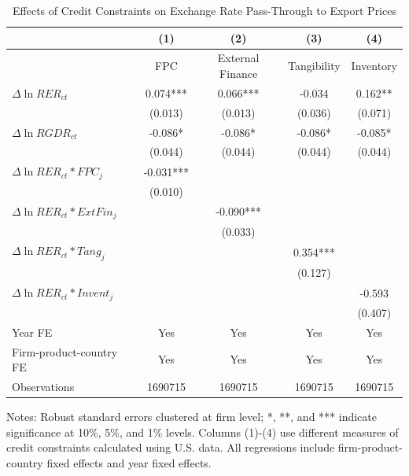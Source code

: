 \begin{table}[H]
	\centering
	\caption{Effects of Credit Constraints on Exchange Rate Pass-Through to Export Prices}
	\begin{threeparttable}	
		\begin{tabular}{lcccc}
			\toprule
			& (1)   & (2)   & (3)   & (4) \\
			\midrule
			& FPC   & External Finance & Tangibility & Inventory \\
			\midrule
			$\Delta \ln RER_{ct}$ & 0.074*** & 0.066*** & -0.034 & 0.162** \\
			& (0.013) & (0.013) & (0.036) & (0.071) \\
			$\Delta \ln RGDR_{ct}$ & -0.086* & -0.086* & -0.086* & -0.085* \\
			& (0.044) & (0.044) & (0.044) & (0.044) \\
			$\Delta \ln RER_{ct}*FPC_{j}$ & -0.031*** &       &       &  \\
			& (0.010) &       &       &  \\
			$\Delta \ln RER_{ct}*ExtFin_{j}$ &  & -0.090*** &       &  \\
			&  & (0.033) &       &  \\
			$\Delta \ln RER_{ct}*Tang_{j}$ &     &       & 0.354*** &  \\
			&     &       & (0.127) &  \\
			$\Delta \ln RER_{ct}*Invent_{j}$ &     &       &       & -0.593 \\
			&    &       &       & (0.407) \\
			Year FE  & Yes   & Yes   & Yes   & Yes \\
			Firm-product-country FE & Yes   & Yes   & Yes   & Yes \\
			Observations & 1690715 & 1690715 & 1690715 & 1690715 \\
			\bottomrule
		\end{tabular}
		\begin{tablenotes}
			\footnotesize
			\item Notes: Robust standard errors clustered at firm level; *, **, and *** indicate significance at 10\%, 5\%, and 1\% levels. Columns (1)-(4) use different measures of credit constraints calculated using U.S. data. All regressions include firm-product-country fixed effects and year fixed effects.
		\end{tablenotes}
	\end{threeparttable}
	\label{tab.credit.exp}
\end{table}

